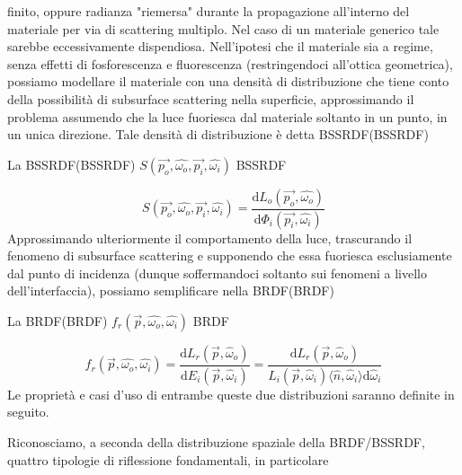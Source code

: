 finito, oppure radianza "riemersa" durante la propagazione all'interno del materiale per via di scattering multiplo. Nel caso di un materiale 
generico tale sarebbe eccessivamente dispendiosa. Nell'ipotesi che il materiale sia a regime, senza effetti di fosforescenza e 
fluorescenza (restringendoci all'ottica geometrica\footnotemark{}), possiamo modellare il materiale con una densit\`a di distribuzione che tiene conto 
della possibilit\`a di subsurface scattering nella superficie, approssimando il problema assumendo che la luce fuoriesca dal materiale soltanto in un 
punto, in un unica direzione. Tale densit\`a di distribuzione \`e detta \Gls{BSSRDF}(BSSRDF)
\begin{definitionS}
	La \Gls{BSSRDF}(BSSRDF) $S(\vec{p_o}, \hat{\omega_o}, \vec{p_i}, \hat{\omega_i})$ \Glsdesc{BSSRDF}
\end{definitionS}
\begin{equation}\label{chapter3:surface:bssrdf}
	S(\vec{p_o}, \hat{\omega_o}, \vec{p_i}, \hat{\omega_i}) = \frac{\mathrm{d}L_o(\vec{p_o},\hat{\omega_o})}{\mathrm{d}\Phi_i(\vec{p_i},\hat{\omega_i})}
\end{equation}
Approssimando ulteriormente il comportamento della luce, trascurando il fenomeno di subsurface scattering e supponendo che essa fuoriesca esclusiamente 
dal punto di incidenza (dunque soffermandoci soltanto sui fenomeni a livello dell'interfaccia), possiamo semplificare nella \Gls{BRDF}(BRDF)
\begin{definitionS}
	La \Gls{BRDF}(BRDF) $f_r(\vec{p},\hat{\omega_o},\hat{\omega_i})$ \Glsdesc{BRDF}
\end{definitionS}
\begin{equation}\label{chapter3:surface:brdf}
	f_r(\vec{p},\hat{\omega_o},\hat{\omega_i}) = \frac{\mathrm{d}L_r(\vec{p}, \hat{\omega}_o)}{\mathrm{d}E_i(\vec{p}, \hat{\omega}_i)}
		= \frac{\mathrm{d}L_r(\vec{p}, \hat{\omega}_o)}{L_i(\vec{p}, \hat{\omega}_i)\langle\hat{n},\hat{\omega}_i\rangle\mathrm{d}\hat{\omega}_i}
\end{equation}
Le propriet\`a e casi d'uso di entrambe queste due distribuzioni saranno definite in seguito.\par
{}
Riconosciamo, a seconda della distribuzione spaziale della BRDF/BSSRDF, quattro tipologie di riflessione fondamentali, in particolare 
